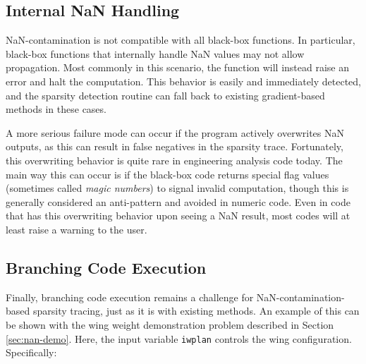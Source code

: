 \subsection{Internal NaN Handling}

NaN-contamination is not compatible with all black-box functions. In particular, black-box functions that internally handle NaN values may not allow propagation. Most commonly in this scenario, the function will instead raise an error and halt the computation. This behavior is easily and immediately detected, and the sparsity detection routine can fall back to existing gradient-based methods in these cases.

A more serious failure mode can occur if the program actively overwrites NaN outputs, as this can result in false negatives in the sparsity trace. Fortunately, this overwriting behavior is quite rare in engineering analysis code today. The main way this can occur is if the black-box code returns special flag values (sometimes called \emph{magic numbers}) to signal invalid computation, though this is generally considered an anti-pattern and avoided in numeric code. Even in code that has this overwriting behavior upon seeing a NaN result, most codes will at least raise a warning to the user.





\subsection{Branching Code Execution}

Finally, branching code execution remains a challenge for NaN-contamination-based sparsity tracing, just as it is with existing methods. An example of this can be shown with the wing weight demonstration problem described in Section \ref{sec:nan-demo}. Here, the input variable \texttt{iwplan} controls the wing configuration. Specifically:

